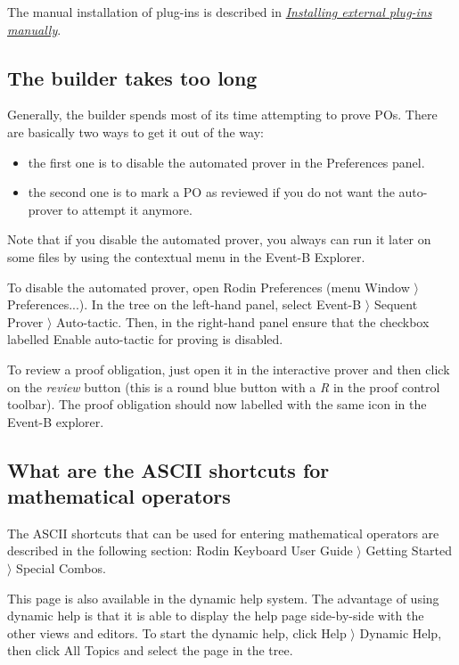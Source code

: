The manual installation of plug-ins is described in \href{http://wiki.event-b.org/index.php/Installing_external_plug-ins_manually}{\emph{Installing external plug-ins manually}}. 

\subsection{The builder takes too long}

Generally, the builder spends most of its time attempting to prove POs. There are basically two ways to get it out of the way: 

\begin{itemize}
	\item the first one is to disable the automated prover in the \textsf{Preferences} panel. 
	\item the second one is to mark a PO as reviewed if you do not want the auto-prover to attempt it anymore. 
\end{itemize}

Note that if you disable the automated prover, you always can run it later on some files by using the contextual menu in the Event-B Explorer. 

To disable the automated prover, open \textsf{Rodin Preferences} 
(menu \textsf{Window $\rangle$ Preferences...}). In the tree on the left-hand panel, select \textsf{Event-B $\rangle$ Sequent Prover $\rangle$ Auto-tactic}. Then, in the right-hand panel ensure that the checkbox labelled \textsf{Enable auto-tactic} for proving is disabled. 

To review a proof obligation, just open it in the interactive prover and then click on the \emph{review} button (this is a round blue button with a \emph{R} in the proof control toolbar). The proof obligation should now labelled with the same icon in the Event-B explorer. 

\subsection{What are the ASCII shortcuts for mathematical operators}

The ASCII shortcuts that can be used for entering mathematical operators are described in the following section: \textsf{Rodin Keyboard User Guide $\rangle$ Getting Started $\rangle$ Special Combos}. 

This page is also available in the dynamic help system. The advantage of using dynamic help is that it is able to display the help page side-by-side with the other views and editors. To start the dynamic help, click \textsf{Help $\rangle$ Dynamic Help}, then click \textsf{All Topics} and select the page in the tree. 

